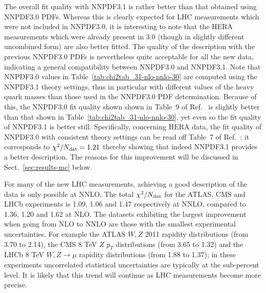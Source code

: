The overall fit quality with NNPDF3.1 is  rather better than that
obtained using NNPDF3.0 PDFs. 
Whereas this is clearly expected for LHC measurements which
were not included in NNPDF3.0, it is
interesting to note that the HERA
measurements which were already present in 3.0 (though in slightly different
uncombined form) are also better fitted. 
 The quality of the description with the
previous NNPDF3.0 PDFs is nevertheless quite acceptable for all the new data, 
indicating a general compatibility between NNPDF3.0 and NNPDF3.1. 
Note that NNPDF3.0 values in
Table~\ref{tab:chi2tab_31-nlo-nnlo-30} are computed using the NNPDF3.1
theory settings, thus in particular with different 
values of the heavy quark masses than those used in the NNPDF3.0 PDF
determination. Because of this, the NNPDF3.0 fit quality
shown shown in Table~9 of Ref.~\cite{Ball:2014uwa} is slightly better than 
that shown in Table~\ref{tab:chi2tab_31-nlo-nnlo-30}, yet even so 
the fit quality of NNPDF3.1 is better still. Specifically, 
concerning HERA data, the fit quality of
NNPDF3.0 with consistent theory settings can be read off Table~7 of
Ref.~\cite{Czakon:2016olj}: it corresponds to  $\chi^2/N_{\rm
  dat}=1.21$ thereby showing that indeed NNPDF3.1 provides a better
description. The reasons for this improvement will be discussed in
Sect.~\ref{sec:results-mc} below.

For many of the new LHC measurements, achieving a good description of the data
is only possible at NNLO. The
total $\chi^2/N_{\rm dat}$ for the ATLAS, CMS and
LHCb experiments is 1.09, 1.06 and 1.47 respectively at NNLO,
compared to 1.36, 1.20 and 1.62 at NLO. The datasets exhibiting
the largest improvement when going from NLO to NNLO are those with the
smallest experimental uncertainties. For example the
ATLAS $W,Z$ 2011 rapidity distributions
(from 3.70 to 2.14), the CMS 8 TeV $Z$ $p_T$ distributions
(from 3.65 to 1.32) and the LHCb 8 TeV $W,Z\to \mu$
rapidity distributions (from 1.88 to 1.37); in these experiments
uncorrelated statistical uncertainties are typically at the
sub-percent level.
%
It is likely that this trend will continue as LHC measurements become more precise.


% 


